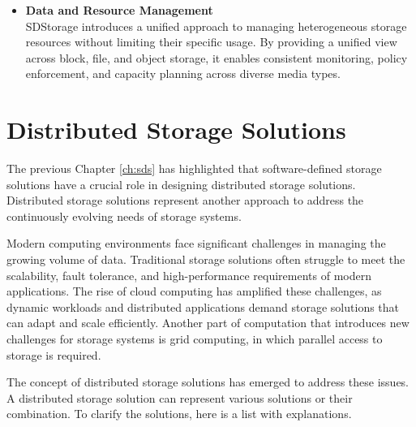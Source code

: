 \begin{itemize}
     API-driven programmability makes infrastructure fully scriptable and allows use of Infrastructure-as-Code practices. \cite{faisal_software-defined_2024}
    \item \textbf{Data and Resource Management} \\
    SDStorage introduces a unified approach to managing heterogeneous storage resources without limiting their specific usage. By providing a unified view across block, file, and object storage, it enables consistent monitoring, policy enforcement, and capacity planning across diverse media types. \cite{faisal_software-defined_2024}

\end{itemize}



\section{Distributed Storage Solutions}\label{sec:distributed_solutions}
The previous Chapter \ref{ch:sds} has highlighted that software-defined storage solutions have a crucial role in designing distributed storage solutions. Distributed storage solutions represent another approach to address the continuously evolving needs of storage systems.

Modern computing environments face significant challenges in managing the growing volume of data. Traditional storage solutions often struggle to meet the scalability, fault tolerance, and high-performance requirements of modern applications. The rise of cloud computing has amplified these challenges, as dynamic workloads and distributed applications demand storage solutions that can adapt and scale efficiently. Another part of computation that introduces new challenges for storage systems is grid computing, in which parallel access to storage is required. \cite{langr_paralelni_2024}

The concept of distributed storage solutions has emerged to address these issues. A distributed storage solution can represent various solutions or their combination. To clarify the solutions, here is a list with explanations.

